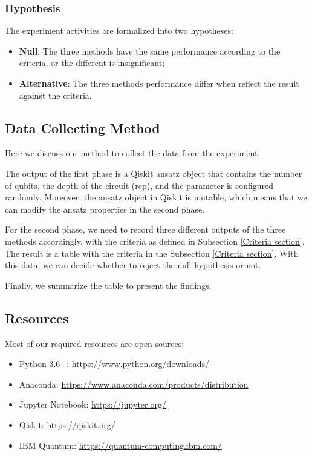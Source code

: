 \subsubsection{Hypothesis}
The experiment activities are formalized into two hypotheses:
\begin{itemize}
    \item \textbf{Null}: The three methods have the same performance according to the criteria, or the different is insignificant;
    \item \textbf{Alternative}: The three methods performance differ when reflect the result against the criteria.
\end{itemize}

\subsection{Data Collecting Method}
\label{Data Collecting Section}
Here we discuss our method to collect the data from the experiment.

The output of the first phase is a Qiskit ansatz object that contains the number of qubits, the depth of the circuit (rep), and the parameter is configured randomly.
Moreover, the ansatz object in Qiskit is mutable, which means that we can modify the ansatz properties in the second phase.

For the second phase, we need to record three different outputs of the three methods accordingly, with the criteria as defined in Subsection \ref{Criteria section}.
The result is a table with the criteria in the Subsection \ref{Criteria section}.
With this data, we can decide whether to reject the null hypothesis or not.

Finally, we summarize the table to present the findings.

\subsection{Resources}
Most of our required resources are open-sources:
\begin{itemize}
    \item Python 3.6+: \url{https://www.python.org/downloads/}
    \item Anaconda: \url{https://www.anaconda.com/products/distribution}
    \item Jupyter Notebook: \url{https://jupyter.org/}
    \item Qiskit: \url{https://qiskit.org/}
    \item IBM Quantum: \url{https://quantum-computing.ibm.com/}
\end{itemize}

